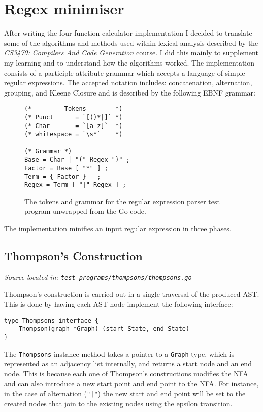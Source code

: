 \section{Regex minimiser}

After writing the four-function calculator implementation I decided to translate some of the algorithms and methods used within lexical analysis described by the \textit{CS3470: Compilers And Code Generation} course. I did this mainly to supplement my learning and to understand how the algorithms worked. The implementation consists of a participle attribute grammar which accepts a language of simple regular expressions. The accepted notation includes: concatenation, alternation, grouping, and Kleene Closure and is described by the following EBNF grammar:

\begin{figure}[H]
    \begin{verbatim}
(*         Tokens        *)
(* Punct      = `[()*|]` *)
(* Char       = `[a-z]`  *)
(* whitespace = `\s*`    *)

(* Grammar *)
Base = Char | "(" Regex ")" ;
Factor = Base [ "*" ] ;
Term = { Factor } - ;
Regex = Term [ "|" Regex ] ;
    \end{verbatim}
    \cprotect\caption{The tokens and grammar for the regular expression parser test program unwrapped from the Go code.}
\end{figure}

The implementation minifies an input regular expression in three phases.

\subsection{Thompson's Construction}
\cprotect\textit{Source located in: \verb|test_programs/thompsons/thompsons.go|}

Thompson's construction is carried out in a single traversal of the produced AST. This is done by having each AST node implement the following interface:

\begin{verbatim}
type Thompsons interface {
    Thompson(graph *Graph) (start State, end State)
}
\end{verbatim}

The \verb|Thompsons| instance method takes a pointer to a \verb|Graph| type, which is represented as an adjacency list internally, and returns a start node and an end node. This is because each one of Thompson's constructions modifies the NFA and can also introduce a new start point and end point to the NFA. For instance, in the case of alternation (\verb+"|"+) the new start and end point will be set to the created nodes that join to the existing nodes using the epsilon transition.

